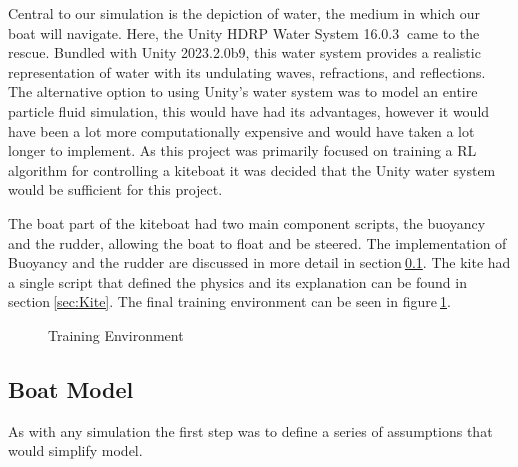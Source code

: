 Central to our simulation is the depiction of water, the medium in which our boat will navigate. Here, the Unity HDRP Water System 16.0.3$~$\cite{UnityHDRPWaterSystem} came to the rescue. Bundled with Unity 2023.2.0b9, this water system provides a realistic representation of water with its undulating waves, refractions, and reflections. 
The alternative option to using Unity's water system was to model an entire particle fluid simulation, this would have had its advantages, however it would have been a lot more computationally expensive and would have taken a lot longer to implement. As this project was primarily focused on training a RL algorithm for controlling a kiteboat it was decided that the Unity water system would be sufficient for this project.  

The boat part of the kiteboat had two main component scripts, the buoyancy and the rudder, allowing the boat to float and be steered. The implementation of Buoyancy and the rudder are discussed in more detail in section$~$\ref{sec:Boat}. The kite had a single script that defined the physics and its explanation can be found in section$~$\ref{sec:Kite}. The final training environment can be seen in figure$~$\ref{training_enviroment}.

\begin{figure}[h]
    \centering
    \caption{Training Environment}\label{training_enviroment}
\end{figure}


\subsection{Boat Model}\label{sec:Boat}

As with any simulation the first step was to define a series of assumptions that would simplify model.

